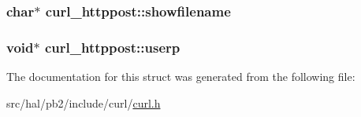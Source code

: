 \subsubsection[{\texorpdfstring{showfilename}{showfilename}}]{\setlength{\rightskip}{0pt plus 5cm}char$\ast$ curl\+\_\+httppost\+::showfilename}\hypertarget{structcurl__httppost_a84945dbb6cf774682227cfaab2ba7e01}{}\label{structcurl__httppost_a84945dbb6cf774682227cfaab2ba7e01}
\subsubsection[{\texorpdfstring{userp}{userp}}]{\setlength{\rightskip}{0pt plus 5cm}void$\ast$ curl\+\_\+httppost\+::userp}\hypertarget{structcurl__httppost_ad2e5d00f8c4c6c536860599701c69694}{}\label{structcurl__httppost_ad2e5d00f8c4c6c536860599701c69694}


The documentation for this struct was generated from the following file\+:\begin{DoxyCompactItemize}
\item 
src/hal/pb2/include/curl/\hyperlink{curl_8h}{curl.\+h}\end{DoxyCompactItemize}

